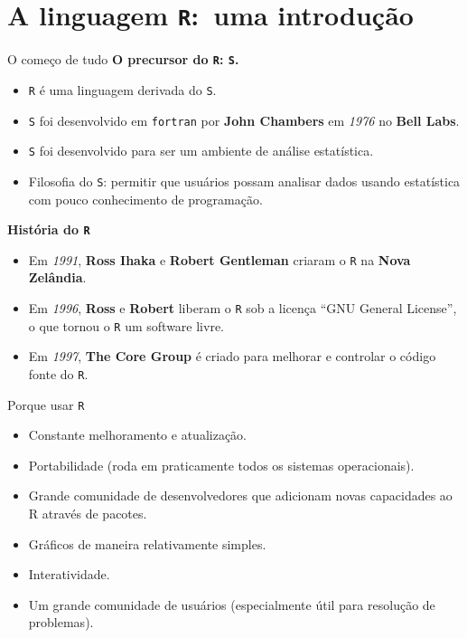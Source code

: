 \documentclass[
  10pt,
  ignorenonframetext,
]{beamer}
\providecommand{\tightlist}{%
  \setlength{\itemsep}{0pt}\setlength{\parskip}{0pt}}\usepackage{longtable,booktabs,array}
\begin{document}
\hypertarget{a-linguagem-r-uma-introduuxe7uxe3o}{%
\section{\texorpdfstring{A linguagem \texttt{R}:\newline\newline~uma
introdução}{A linguagem R:~uma introdução}}\label{a-linguagem-r-uma-introduuxe7uxe3o}}

\begin{frame}[fragile]{O começo de tudo}
\protect\hypertarget{o-comeuxe7o-de-tudo}{}
\textbf{O precursor do \texttt{R}: \texttt{S}.}

\begin{itemize}
\tightlist
\item
  \texttt{R} é uma linguagem derivada do \texttt{S}.
\item
  \texttt{S} foi desenvolvido em \texttt{fortran} por \textbf{John
  Chambers} em \emph{1976} no \textbf{Bell Labs}.
\item
  \texttt{S} foi desenvolvido para ser um ambiente de análise
  estatística.
\item
  Filosofia do \texttt{S}: permitir que usuários possam analisar dados
  usando estatística com pouco conhecimento de programação.
\end{itemize}

\textbf{História do \texttt{R}}

\begin{itemize}
\tightlist
\item
  Em \emph{1991}, \textbf{Ross Ihaka} e \textbf{Robert Gentleman}
  criaram o \texttt{R} na \textbf{Nova Zelândia}.
\item
  Em \emph{1996}, \textbf{Ross} e \textbf{Robert} liberam o \texttt{R}
  sob a licença ``GNU General License'', o que tornou o \texttt{R} um
  software livre.
\item
  Em \emph{1997}, \textbf{The Core Group} é criado para melhorar e
  controlar o código fonte do \texttt{R}.
\end{itemize}
\end{frame}

\begin{frame}{Porque usar \texttt{R}}
\protect\hypertarget{porque-usar-r}{}
\begin{itemize}
\tightlist
\item
  Constante melhoramento e atualização.
\item
  Portabilidade (roda em praticamente todos os sistemas operacionais).
\item
  Grande comunidade de desenvolvedores que adicionam novas capacidades
  ao R através de pacotes.
\item
  Gráficos de maneira relativamente simples.
\item
  Interatividade.
\item
  Um grande comunidade de usuários (especialmente útil para resolução de
  problemas).
\end{itemize}
\end{frame}
\end{document}

